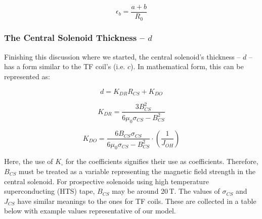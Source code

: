 \begin{equation}
	\epsilon_b = \frac{ a + b }{R_0}
\end{equation}

\subsubsection{The Central Solenoid Thickness -- $d$}

Finishing this discussion where we started, the central solenoid's thickness -- $d$ -- has a form similar to the TF coil's (i.e. $c$). In mathematical form, this can be represented as: \cite{minervini}

 \begin{equation}
 	\label{eq:dd}
	d = K_{DR} R_{CS} + K_{DO}
\end{equation}

\begin{equation}
	K_{DR} = \frac{3 B_{CS}^2}{ 6 \mu_0 \sigma_{CS}  - B_{CS}^2 }
\end{equation}

\begin{equation}
	K_{DO} = \frac{6 B_{CS} \sigma_{CS}}{ 6 \mu_0 \sigma_{CS}  - B_{CS}^2 } \cdot \left( \frac{1}{J_{OH}} \right)
\end{equation}

Here, the use of $K_\square$ for the coefficients signifies their use as  coefficients. Therefore, $B_{CS}$ must be treated as a  variable representing the magnetic field strength in the central solenoid. For prospective solenoids using high temperature superconducting (HTS) tape, $B_{CS}$ may be around 20\,T. The values of $\sigma_{CS}$ and $J_{CS}$ have similar meanings to the ones for TF coils. These are collected in a table below with example values representative of our model.

